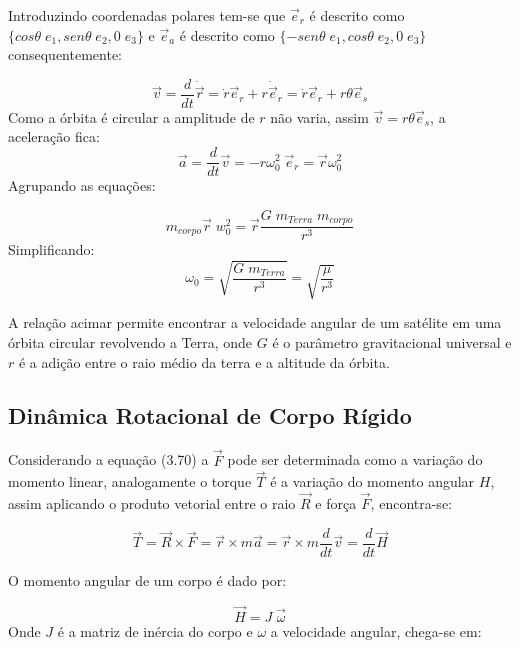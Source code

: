 Introduzindo coordenadas polares tem-se que  $\vec{e}_r$ é descrito como $\{cos\theta\;e_1, sen\theta\;e_2, 0\; e_3\}$ e $\vec{e}_a$ é descrito como $\{-sen\theta\;e_1, cos\theta\;e_2, 0\; e_3\}$ consequentemente:

\begin{equation}
\vec{v} =\frac{d}{dt}\dot{\vec{r}}=\dot{r}\vec{e}_r+r\dot{\vec{e}}_r=\dot{r}\vec{e}_r+r\theta\vec{e}_s
\end{equation}
Como a órbita é circular a amplitude de $r$ não varia, assim $\vec{v}=r\theta\vec{e}_s$, a aceleração fica:
\begin{equation}\vec{a}=\frac{d}{dt}\vec{v}=-r\omega_0^2\;\vec{e}_r=\vec{r}\omega_0^2\end{equation}
Agrupando as equações:

\begin{equation}
m_{corpo}\vec{r}\;w_0^2=\vec{r}\frac{G\;m_{Terra}\;m_{corpo}}{r^3}
\end{equation}Simplificando:
\begin{equation}
\omega_0=\sqrt{\frac{G\;m_{Terra}}{r^3}}=\sqrt{\frac{\mu}{r^3}}
\end{equation}

A relação acimar permite encontrar a velocidade angular de um satélite em uma órbita circular revolvendo a Terra, onde $G$ é o parâmetro gravitacional universal e $r$ é a adição entre o raio médio da terra e a altitude da órbita. 

\subsection{Dinâmica Rotacional de Corpo Rígido}\label{sec:3.1.3.2}

Considerando a equação (3.70) a $\vec{F}$ pode ser determinada como a variação do momento linear, analogamente o torque $\vec{T}$ é a variação do momento angular $H$, assim aplicando o produto vetorial entre o raio  $\vec{R}$ e força $\vec{F}$, encontra-se:

\begin{equation}\vec{T}=\vec{R} \times\vec{F} =\vec{r} \times m\vec{a}=\vec{r} \times m \frac{d}{dt}\vec{v}=\frac{d}{dt}\vec{H}\end{equation}


O momento angular de um corpo é dado por:

\begin{equation}\vec{H} = J\;\vec{\omega}\end{equation}Onde $J$ é a matriz de inércia do corpo e $\omega$ a velocidade angular, chega-se em:

